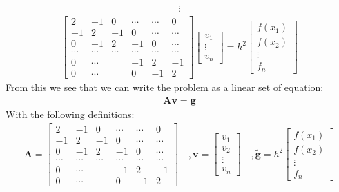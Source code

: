 \documentclass[american,a4paper,12pt]{article}
\renewcommand{\vec}[1]{\mathbf{#1}} %
\begin{document}
    \begin{align*}
      \vdots
    \end{align*}
    \begin{align*}
          \begin{bmatrix}
            2 & -1 & 0 & \cdots & \cdots & 0 \\
            -1 & 2 & -1 & 0 & \cdots & \cdots \\
            0 & -1 & 2 & -1 & 0 & \cdots \\
            \cdots & \cdots & \cdots & \cdots & \cdots & \cdots \\
            0 & \cdots & & -1 & 2 & -1 \\
            0 & \cdots & & 0 & -1 & 2
          \end{bmatrix}
          \begin{bmatrix}
            v_1 \\
            \vdots \\
            v_n
          \end{bmatrix}
    = h^2
          \begin{bmatrix}
            f(x_1) \\
            f(x_2) \\
            \vdots \\
            f_n
          \end{bmatrix}
    \end{align*}
    From this we see that we can write the problem as a linear set of equation:
    \begin{align*}
      \vec{A}\vec{v} = \vec{g}
    \end{align*}
    With the following definitions:
    \begin{align*}
      \vec{A} =
      \begin{bmatrix}
        2 & -1 & 0 & \cdots & \cdots & 0 \\
        -1 & 2 & -1 & 0 & \cdots & \cdots \\
        0 & -1 & 2 & -1 & 0 & \cdots \\
        \cdots & \cdots & \cdots & \cdots & \cdots & \cdots \\
        0 & \cdots & & -1 & 2 & -1 \\
        0 & \cdots & & 0 & -1 & 2
      \end{bmatrix}
      \quad, \vec{v} =
      \begin{bmatrix}
        v_1 \\
        v_2 \\
        \vdots \\
        v_n
      \end{bmatrix}
      \quad, \vec{\tilde{g}} = h^2
      \begin{bmatrix}
        f(x_1) \\
        f(x_2) \\
        \vdots \\
        f_n
      \end{bmatrix}
    \end{align*}
\end{document}
